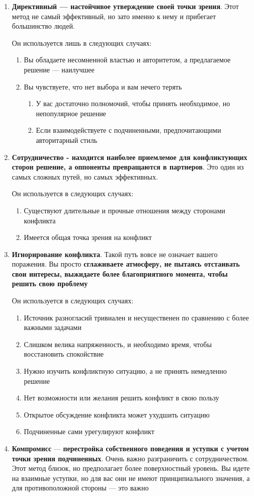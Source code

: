 \documentclass{article}
\begin{document}
\begin{enumerate}
    \item \textbf{Директивный — настойчивое утверждение своей точки зрения}. Этот метод не самый эффективный, но зато именно к нему и прибегает большинство людей.

    Он используется лишь в следующих случаях:
    \begin{enumerate}
        \item Вы обладаете несомненной властью и авторитетом, а предлагаемое решение — наилучшее
        \item Вы чувствуете, что нет выбора и вам нечего терять
        \begin{enumerate}
            \item У вас достаточно полномочий, чтобы принять необходимое, но непопулярное решение
            \item Если взаимодействуете с подчиненными, предпочитающими авторитарный стиль
        \end{enumerate}
    \end{enumerate}
    \item \textbf{Сотрудничество - находится наиболее приемлемое для конфликтующих сторон решение, а оппоненты превращаются в партнеров}. Это один из самых сложных путей, но самых эффективных.

    Он используется в следующих случаях:
    \begin{enumerate}
        \item Существуют длительные и прочные отношения между сторонами конфликта
        \item Имеется общая точка зрения на конфликт
    \end{enumerate}
    \item \textbf{Игнорирование конфликта}. Такой путь вовсе не означает вашего поражения. Вы просто \textbf{сглаживаете атмосферу, не пытаясь отстаивать свои интересы, выжидаете более благоприятного момента, чтобы решить свою проблему}

    Он используется в следующих случаях:
    \begin{enumerate}
        \item Источник разногласий тривиален и несущественен по сравнению с более важными задачами
        \item Слишком велика напряженность, и необходимо время, чтобы восстановить спокойствие
        \item Нужно изучить конфликтную ситуацию, а не принять немедленно решение
        \item Нет возможности или желания решить конфликт в свою пользу
        \item Открытое обсуждение конфликта может ухудшить ситуацию
        \item Подчиненные сами урегулируют конфликт
    \end{enumerate}
    \item \textbf{Компромисс} — \textbf{перестройка собственного поведения и уступки с учетом точки зрения подчиненных}. Очень важно разграничить с сотрудничеством. Этот метод близок, но предполагает более поверхностный уровень. Вы идете на взаимные уступки, но для вас они не имеют принципиального значения, а для противоположной стороны — это важно


\end{enumerate}
\end{document}
